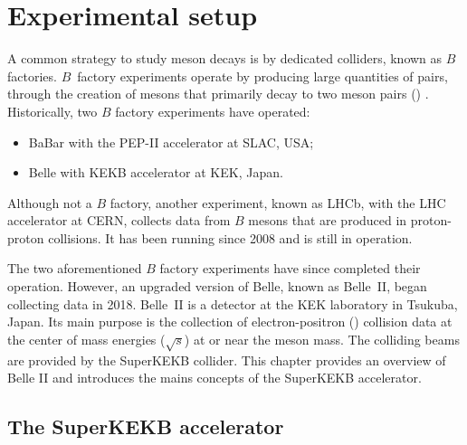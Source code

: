 \chapter{Experimental setup}\label{chap:belle2}

A common strategy to study \B meson decays is by dedicated colliders, known as $B$ factories.
$B$~factory experiments operate by producing large quantities of \BB pairs, through the creation of \FourS mesons that primarily decay to two \B meson pairs (\BB) \cite{Workman:2022ynf}.
Historically, two $B$ factory experiments have operated:
\begin{itemize}
    \item BaBar with the PEP-II accelerator at SLAC, USA;
    \item Belle with KEKB accelerator at KEK, Japan.
\end{itemize}
Although not a $B$ factory, another experiment, known as LHCb, with the LHC accelerator at CERN, collects data from $B$ mesons that are produced in proton-proton collisions.
It has been running since 2008 and is still in operation.

The two aforementioned $B$ factory experiments have since completed their operation.
However, an upgraded version of Belle, known as Belle~II, began collecting data in 2018.
Belle~II is a detector at the KEK laboratory in Tsukuba, Japan.
Its main purpose is the collection of electron-positron (\epem) collision data 
at the center of mass energies ($\sqrt{s}$) at or near the \FourS meson mass.
The colliding beams are provided by the SuperKEKB \epem collider.
This chapter provides an overview of Belle II and introduces the mains concepts of the SuperKEKB accelerator.


\section{The SuperKEKB accelerator}\label{sec:superkekb}

